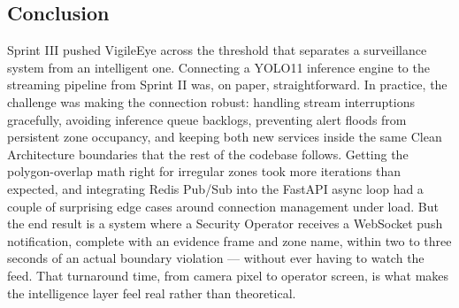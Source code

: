 \subsection*{Conclusion}

\hspace{0.8cm}Sprint III pushed VigileEye across the threshold that separates a surveillance system from an intelligent one. Connecting a YOLO11 inference engine to the streaming pipeline from Sprint II was, on paper, straightforward. In practice, the challenge was making the connection robust: handling stream interruptions gracefully, avoiding inference queue backlogs, preventing alert floods from persistent zone occupancy, and keeping both new services inside the same Clean Architecture boundaries that the rest of the codebase follows. Getting the polygon-overlap math right for irregular zones took more iterations than expected, and integrating Redis Pub/Sub into the FastAPI async loop had a couple of surprising edge cases around connection management under load. But the end result is a system where a Security Operator receives a WebSocket push notification, complete with an evidence frame and zone name, within two to three seconds of an actual boundary violation --- without ever having to watch the feed. That turnaround time, from camera pixel to operator screen, is what makes the intelligence layer feel real rather than theoretical.


